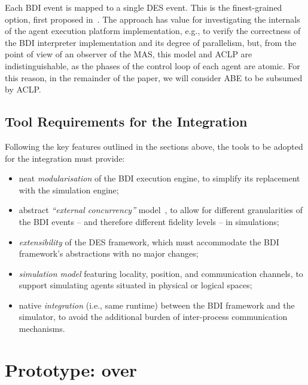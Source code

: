 Each \ac{BDI} event is mapped to a single \ac{DES} event.
%
This is the finest-grained option,
first proposed in~\cite{ricci_exploiting_2020}.
%
The approach has value for investigating the internals of the agent execution platform implementation,
e.g., to verify the correctness of the \ac{BDI} interpreter implementation
and its degree of parallelism,
but,
from the point of view of an observer of the \ac{MAS},
this model and \ac{ACLP} are indistinguishable,
as the phases of the control loop of each agent are atomic.
%
For this reason, in the remainder of the paper,
we will consider \ac{ABE} to be subsumed by \ac{ACLP}.

\subsection{Tool Requirements for the Integration}
\label{ssec:simulation:requirements}
Following the key features outlined in the sections above,
the tools to be adopted for the integration must provide:
\begin{itemize}
    \item neat \emph{modularisation} of the \ac{BDI} execution engine,
    to simplify its replacement with the simulation engine;
    \item abstract \emph{``external concurrency''} model~\cite{BaiardiBCPOR24},
    to allow for different granularities of the \ac{BDI} events
    -- and therefore different fidelity levels --
    in simulations;
    \item \emph{extensibility} of the \ac{DES} framework,
    which must accommodate the \ac{BDI} framework's abstractions with no major changes;
    \item \emph{simulation model} featuring locality, position, and communication channels,
    to support simulating agents situated in physical or logical spaces;
    \item native \emph{integration} (i.e., same runtime) between the \ac{BDI} framework and the simulator,
    to avoid the additional burden of inter-process communication mechanisms.
\end{itemize}

\section{Prototype: \jakta{} over \alchemist{}}
\label{sec:simulation:prototype}


